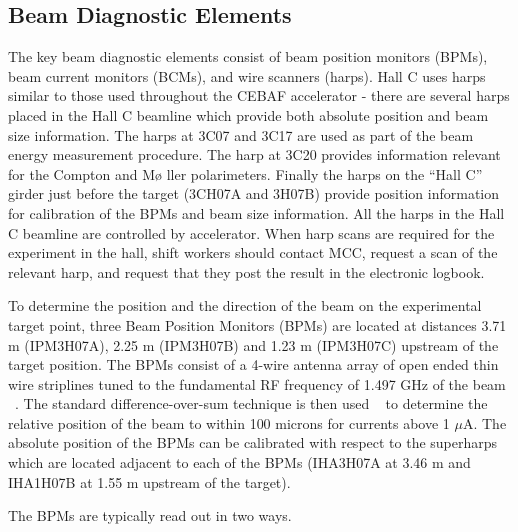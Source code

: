 {\subsection{Beam Diagnostic Elements}

The key beam diagnostic elements consist of beam position monitors
(BPMs), beam current monitors (BCMs), and wire scanners (harps). Hall
C uses harps similar to those used throughout the CEBAF accelerator -
there are several harps placed in the Hall C beamline which provide
both absolute position and beam size information.  The harps at 3C07
and 3C17 are used as part of the beam energy measurement procedure.
The harp at 3C20 provides information relevant for the Compton and M\o
ller polarimeters. Finally the harps on the ``Hall C'' girder just
before the target (3CH07A and 3H07B) provide position information for
calibration of the BPMs and beam size information. All the harps in
the Hall C beamline are controlled by accelerator. When harp scans are
required for the experiment in the hall, shift workers should contact
MCC, request a scan of the relevant harp, and request that they post
the result in the electronic logbook.

To determine the position and the direction of the beam on the
experimental target point, three Beam Position Monitors (BPMs) are
located at distances 3.71 m (IPM3H07A), 2.25 m (IPM3H07B) and 1.23 m
(IPM3H07C) upstream of the target position.  The BPMs consist of a
4-wire antenna array of open ended thin wire striplines tuned to the
fundamental RF frequency of 1.497 GHz of the beam
~\cite{bi:bar90}. The standard difference-over-sum technique is then
used ~\cite{bi:HW} to determine the relative position of the beam to
within 100 microns for currents above 1 $\mu $A. The absolute position
of the BPMs can be calibrated with respect to the superharps which are
located adjacent to each of the BPMs (IHA3H07A at 3.46 m and IHA1H07B
at 1.55 m upstream of the target).

The BPMs are typically read out in two ways.
}

